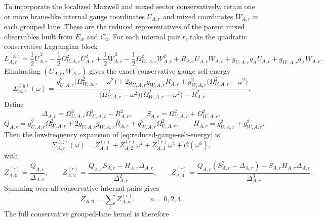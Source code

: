 \documentclass[11pt]{article}
\theoremstyle{definition}
\newcommand{\cO}{\mathcal O}
\begin{document}
To incorporate the localized Maxwell and mixed sector conservatively, retain one or more brane-like internal gauge coordinates $U_{A,r}$ and mixed coordinates $W_{A,r}$ in each grouped lane. These are the reduced representatives of the parent mixed observables built from $E_w$ and $C_a$. For each internal pair $r$, take the quadratic conservative Lagrangian block
\begin{equation}
L_{A,r}^{(\mathrm{g})}
=
\frac12\dot U_{A,r}^{\,2}-\frac12\Omega_{U,A,r}^2 U_{A,r}^2
+
\frac12\dot W_{A,r}^{\,2}-\frac12\Omega_{W,A,r}^2 W_{A,r}^2
+
R_{A,r}U_{A,r}W_{A,r}
+
g_{U,A,r}q_AU_{A,r}
+
g_{W,A,r}q_AW_{A,r}.
\label{eq:reduced-gauge-lagrangian}
\end{equation}
Eliminating $(U_{A,r},W_{A,r})$ gives the exact conservative gauge self-energy
\begin{equation}
\Sigma_{A,r}^{(\mathrm{g})}(\omega)
=
\frac{g_{U,A,r}^2\bigl(\Omega_{W,A,r}^2-\omega^2\bigr)
+2g_{U,A,r}g_{W,A,r}R_{A,r}
+g_{W,A,r}^2\bigl(\Omega_{U,A,r}^2-\omega^2\bigr)}{
\bigl(\Omega_{U,A,r}^2-\omega^2\bigr)
\bigl(\Omega_{W,A,r}^2-\omega^2\bigr)-R_{A,r}^2}.
\label{eq:reduced-gauge-self-energy}
\end{equation}
Define
\begin{equation}
\Delta_{A,r}=\Omega_{U,A,r}^2\Omega_{W,A,r}^2-R_{A,r}^2,
\qquad
S_{A,r}=\Omega_{U,A,r}^2+\Omega_{W,A,r}^2,
\label{eq:reduced-gauge-deltaS}
\end{equation}
\begin{equation}
Q_{A,r}=g_{U,A,r}^2\Omega_{W,A,r}^2+2g_{U,A,r}g_{W,A,r}R_{A,r}+g_{W,A,r}^2\Omega_{U,A,r}^2,
\qquad
H_{A,r}=g_{U,A,r}^2+g_{W,A,r}^2.
\label{eq:reduced-gauge-QH}
\end{equation}
Then the low-frequency expansion of \eqref{eq:reduced-gauge-self-energy} is
\begin{equation}
\Sigma_{A,r}^{(\mathrm{g})}(\omega)
=
Z_{A,0}^{(r)}+Z_{A,2}^{(r)}\omega^2+Z_{A,4}^{(r)}\omega^4+\cO(\omega^6),
\label{eq:reduced-gauge-expansion}
\end{equation}
with
\begin{equation}
Z_{A,0}^{(r)}=\frac{Q_{A,r}}{\Delta_{A,r}},
\qquad
Z_{A,2}^{(r)}=\frac{Q_{A,r}S_{A,r}-H_{A,r}\Delta_{A,r}}{\Delta_{A,r}^2},
\qquad
Z_{A,4}^{(r)}=\frac{Q_{A,r}(S_{A,r}^2-\Delta_{A,r})-S_{A,r}H_{A,r}\Delta_{A,r}}{\Delta_{A,r}^3}.
\label{eq:reduced-gauge-moments}
\end{equation}
Summing over all conservative internal pairs gives
\[
Z_{A,n}=\sum_r Z_{A,n}^{(r)},
\qquad n=0,2,4.
\]
The full conservative grouped-lane kernel is therefore
\end{document}
